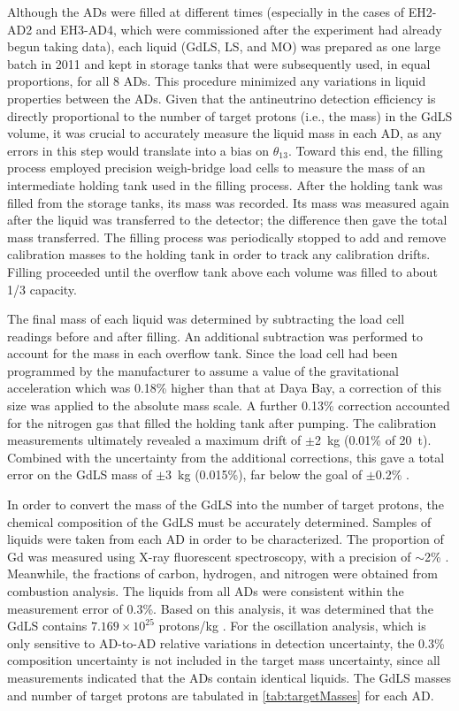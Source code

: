 \documentclass[../thesis.tex]{subfiles}
\begin{document}
Although the ADs were filled at different times (especially in the cases of EH2-AD2 and EH3-AD4, which were commissioned after the experiment had already begun taking data), each liquid (GdLS, LS, and MO) was prepared as one large batch in 2011 and kept in storage tanks that were subsequently used, in equal proportions, for all 8 ADs. This procedure minimized any variations in liquid properties between the ADs. Given that the antineutrino detection efficiency is directly proportional to the number of target protons (i.e., the mass) in the GdLS volume, it was crucial to accurately measure the liquid mass in each AD, as any errors in this step would translate into a bias on $\theta_{13}$. Toward this end, the filling process employed precision weigh-bridge load cells to measure the mass of an intermediate holding tank used in the filling process. After the holding tank was filled from the storage tanks, its mass was recorded. Its mass was measured again after the liquid was transferred to the detector; the difference then gave the total mass transferred. The filling process was periodically stopped to add and remove calibration masses to the holding tank in order to track any calibration drifts. Filling proceeded until the overflow tank above each volume was filled to about 1/3 capacity.

The final mass of each liquid was determined by subtracting the load cell readings before and after filling. An additional subtraction was performed to account for the mass in each overflow tank. Since the load cell had been programmed by the manufacturer to assume a value of the gravitational acceleration which was 0.18\% higher than that at Daya Bay, a correction of this size was applied to the absolute mass scale. A further 0.13\% correction accounted for the nitrogen gas that filled the holding tank after pumping. The calibration measurements ultimately revealed a maximum drift of $\pm$2~kg (0.01\% of 20~t). Combined with the uncertainty from the additional corrections, this gave a total error on the GdLS mass of $\pm$3~kg (0.015\%), far below the goal of $\pm$0.2\% \cite{Band_2013}.

In order to convert the mass of the GdLS into the number of target protons, the chemical composition of the GdLS must be accurately determined. Samples of liquids were taken from each AD in order to be characterized. The proportion of Gd was measured using X-ray fluorescent spectroscopy, with a precision of $\sim$2\% \cite{AN2016133}. Meanwhile, the fractions of carbon, hydrogen, and nitrogen were obtained from combustion analysis. The liquids from all ADs were consistent within the measurement error of 0.3\%. Based on this analysis, it was determined that the GdLS contains $7.169 \times 10^{25}$ protons/kg \cite{Band_2013}. For the oscillation analysis, which is only sensitive to AD-to-AD relative variations in detection uncertainty, the 0.3\% composition uncertainty is not included in the target mass uncertainty, since all measurements indicated that the ADs contain identical liquids. The GdLS masses and number of target protons are tabulated in \autoref{tab:targetMasses} for each AD.
\end{document}

